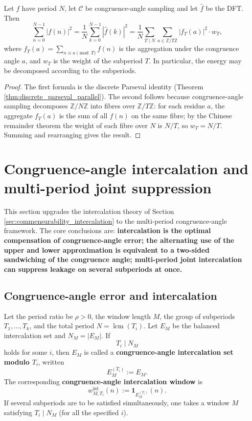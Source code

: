 \begin{theorem}\label{thm:congruence_parseval}
Let $f$ have period $N$, let $\mathcal{C}$ be congruence-angle sampling and let $\hat f$ be the DFT. Then
\[
\sum_{n=0}^{N-1}|f(n)|^2 = \frac{1}{N}\sum_{k=0}^{N-1}|\hat f(k)|^2
= \frac{1}{N}\sum_{T\mid N}\sum_{a\in\mathbb{Z}/T\mathbb{Z}}|f_T(a)|^2\cdot w_T,
\]
where $f_T(a)=\sum_{n\equiv a\pmod T}f(n)$ is the aggregation under the congruence angle $a$, and $w_T$ is the weight of the subperiod $T$. In particular, the energy may be decomposed according to the subperiods.
\end{theorem}

\begin{proof}
The first formula is the discrete Parseval identity (Theorem \ref{thm:discrete_parseval_parallel}). The second follows because congruence-angle sampling decomposes $\mathbb{Z}/N\mathbb{Z}$ into fibres over $\mathbb{Z}/T\mathbb{Z}$: for each residue $a$, the aggregate $f_T(a)$ is the sum of all $f(n)$ on the same fibre; by the Chinese remainder theorem the weight of each fibre over $N$ is $N/T$, so $w_T=N/T$. Summing and rearranging gives the result.
\end{proof}

\section{Congruence-angle intercalation and multi-period joint suppression}\label{sec:congruence_angle_intercalation}

This section upgrades the intercalation theory of Section \ref{sec:commensurability_intercalation} to the multi-period congruence-angle framework. The core conclusions are: \textbf{intercalation is the optimal compensation of congruence-angle error; the alternating use of the upper and lower approximation is equivalent to a two-sided sandwiching of the congruence angle; multi-period joint intercalation can suppress leakage on several subperiods at once.}

\subsection{Congruence-angle error and intercalation}

\begin{definition}\label{def:congruence_angle_intercalation}
Let the period ratio be $\rho>0$, the window length $M$, the group of subperiods $T_1,\dots,T_k$, and the total period $N=\operatorname{lcm}(T_i)$. Let $E_M$ be the balanced intercalation set and $N_M=|E_M|$. If
\[
T_i\mid N_M
\]
holds for some $i$, then $E_M$ is called a \textbf{congruence-angle intercalation set modulo $T_i$}, written
\[
E_M^{(T_i)}:=E_M.
\]
The corresponding \textbf{congruence-angle intercalation window} is
\[
w^{\mathrm{int}}_{M,T_i}(n):=\mathbf{1}_{E_M^{(T_i)}}(n).
\]
If several subperiods are to be satisfied simultaneously, one takes a window $M$ satisfying $T_i\mid N_M$ (for all the specified $i$).
\end{definition}

